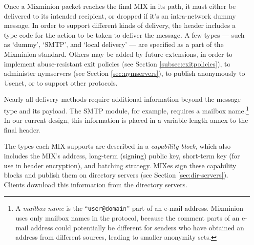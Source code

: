 \documentclass{llncs}
\begin{document}
Once a Mixminion packet reaches the final MIX in its path, it must
either be delivered to its intended recipient, or dropped if it's an
intra-network dummy message. In order to support different kinds of
delivery, the header includes a type code for the action to be taken
to deliver the message.  A few types --- such as `dummy', `SMTP', and `local
delivery' --- are specified as a part of the Mixminion standard.  Others
may be added by future extensions, in order to implement
abuse-resistant exit policies (see Section \ref{subsec:exitpolicies}),
to administer nymservers (see Section \ref{sec:nymservers}), to publish
anonymously to Usenet, or to support other protocols.

Nearly all delivery methods require additional information beyond the
message type and its payload.  The SMTP module, for example, requires
a mailbox name.\footnote{A {\it mailbox name} is the ``{\tt user@domain}''
part of an e-mail address. Mixminion uses only mailbox names in the
protocol, because the comment parts of an e-mail address could potentially
be different for senders who have obtained an address from different
sources, leading to smaller anonymity sets.}
In our current design, this information is placed
in a variable-length annex to the final header.
%

The types each MIX supports are described in a \emph{capability block},
which also includes the MIX's address, long-term (signing) public key,
short-term key (for use in header encryption), and batching strategy.
MIXes sign these capability blocks
and publish them on directory servers (see Section \ref{sec:dir-servers}).
Clients download this information from the directory servers.
\end{document}
